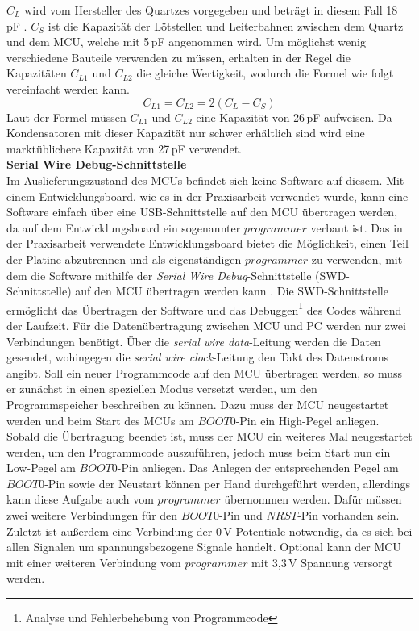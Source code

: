 \textit{$C_L$} wird vom Hersteller des Quartzes vorgegeben und beträgt in diesem Fall 18\,pF \cite{QuartzMN}. \textit{$C_S$} ist die Kapazität der Lötstellen und Leiterbahnen zwischen dem Quartz und dem MCU, welche mit 5\,pF angenommen wird. Um möglichst wenig verschiedene Bauteile verwenden zu müssen, erhalten in der Regel die Kapazitäten $C_{L1}$ und $C_{L2}$ die gleiche Wertigkeit, wodurch die Formel wie folgt vereinfacht werden kann.
\begin{equation}
	C_{L1} =  C_{L2} = 2(C_L - C_S)
\end{equation}
Laut der Formel müssen $C_{L1}$ und $C_{L2}$ eine Kapazität von 26\,pF aufweisen. Da Kondensatoren mit dieser Kapazität nur schwer erhältlich sind wird eine marktüblichere Kapazität von 27\,pF verwendet.\\
\newline
\textbf{Serial Wire Debug-Schnittstelle}\\
Im Auslieferungszustand des MCUs befindet sich keine Software auf diesem. Mit einem Entwicklungsboard, wie es in der Praxisarbeit verwendet wurde, kann eine Software einfach über eine USB-Schnittstelle auf den MCU übertragen werden, da auf dem Entwicklungsboard ein sogenannter $programmer$ verbaut ist. Das in der Praxisarbeit verwendete Entwicklungsboard bietet die Möglichkeit, einen Teil der Platine abzutrennen und als eigenständigen $programmer$ zu verwenden, mit dem die Software mithilfe der \textit{Serial Wire Debug}-Schnittstelle (SWD-Schnittstelle) auf den MCU übertragen werden kann \cite[S.18-19]{F446RE_UM}. Die SWD-Schnittstelle ermöglicht das Übertragen der Software und das Debuggen\footnote{Analyse und Fehlerbehebung von Programmcode} des Codes während der Laufzeit. Für die Datenübertragung zwischen MCU und PC werden nur zwei Verbindungen benötigt. Über die \textit{serial wire data}-Leitung werden die Daten gesendet, wohingegen die \textit{serial wire clock}-Leitung den Takt des Datenstroms angibt. Soll ein neuer Programmcode auf den MCU übertragen werden, so muss er zunächst in einen speziellen Modus versetzt werden, um den Programmspeicher beschreiben zu können. Dazu muss der MCU neugestartet werden und beim Start des MCUs am $BOOT0$-Pin ein High-Pegel anliegen. Sobald die Übertragung beendet ist, muss der MCU ein weiteres Mal neugestartet werden, um den Programmcode auszuführen, jedoch muss beim Start nun ein Low-Pegel am $BOOT0$-Pin anliegen. Das Anlegen der entsprechenden Pegel am $BOOT0$-Pin sowie der Neustart können per Hand durchgeführt werden, allerdings kann diese Aufgabe auch vom $programmer$ übernommen werden. Dafür müssen zwei weitere Verbindungen für den $BOOT0$-Pin und $NRST$-Pin vorhanden sein. Zuletzt ist außerdem eine Verbindung der 0\,V-Potentiale notwendig, da es sich bei allen Signalen um spannungsbezogene Signale handelt. Optional kann der MCU mit einer weiteren Verbindung vom $programmer$ mit 3,3\,V Spannung versorgt werden.\\
